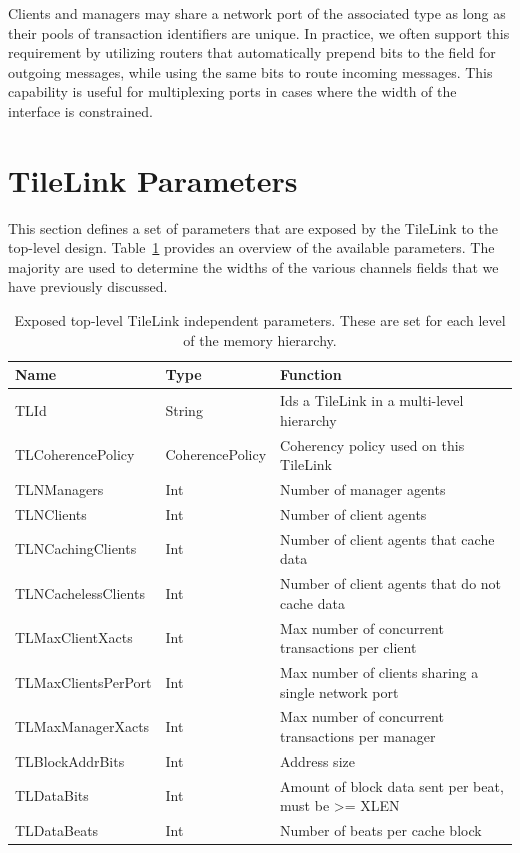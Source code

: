 Clients and managers may share a network port of the associated type as long as their pools of transaction identifiers are unique.
In practice, we often support this requirement by utilizing routers that automatically prepend bits to the  field
for outgoing messages, while using the same bits to route incoming messages.
This capability is useful for multiplexing ports in cases where the width of the interface is constrained.

\section{TileLink Parameters}
\label{s.tlparam}

This section defines a set of parameters that are exposed by the TileLink to the top-level design.
Table~\ref{tab:tlparams} provides an overview of the available parameters.
The majority are used to determine the widths of the various channels fields that we have previously discussed.

\begin{table}[t]
\begin{center}
\begin{tabular}{|l|l|l|}
    \hline
Name & Type & Function \\ \hline \hline
TLId & String & Ids a TileLink in a multi-level hierarchy \\ \hline
TLCoherencePolicy & CoherencePolicy & Coherency policy used on this TileLink \\ \hline
TLNManagers & Int & Number of manager agents \\ \hline
TLNClients & Int & Number of client agents \\ \hline
TLNCachingClients & Int & Number of client agents that cache data \\ \hline
TLNCachelessClients & Int & Number of client agents that do not cache data \\ \hline
TLMaxClientXacts & Int & Max number of concurrent transactions per client \\ \hline
TLMaxClientsPerPort & Int & Max number of clients sharing a single network port \\ \hline
TLMaxManagerXacts & Int & Max number of concurrent transactions per manager \\ \hline
TLBlockAddrBits & Int & Address size \\ \hline
TLDataBits & Int & Amount of block data sent per beat, must be >= XLEN \\ \hline
TLDataBeats & Int & Number of beats per cache block \\ \hline
\end{tabular}
\end{center}
\caption{Exposed top-level TileLink independent parameters. These are set for each level of the memory hierarchy.}
\label{tab:tlparams}
\end{table}

